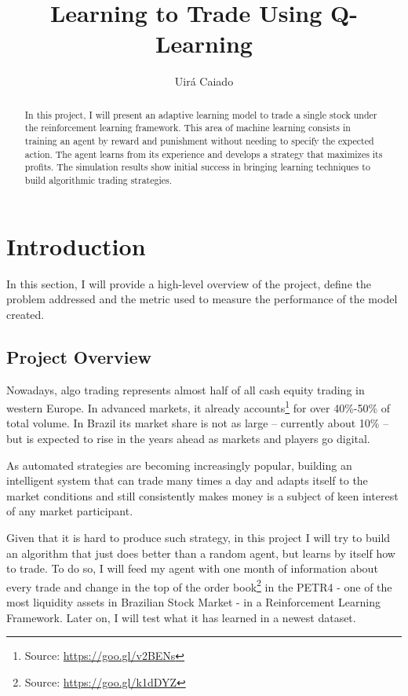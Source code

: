 \documentclass[a4paper]{article}
\title{Learning to Trade Using Q-Learning}
\author{Uirá Caiado}
\begin{document}
\maketitle

\begin{abstract}
In this project, I will present an adaptive learning model to trade a single stock under the reinforcement learning framework. This area of machine learning consists in training an agent by reward and punishment without needing to specify the expected action. The agent learns from its experience and develops a strategy that maximizes its profits. The simulation results show initial success in bringing learning techniques to build algorithmic trading strategies.
\end{abstract}


\section{Introduction}
\label{sec:introduction}

In this section, I will provide a high-level overview of the project, define the problem addressed and the metric used to measure the performance of the model created.

\subsection{Project Overview}
Nowadays, algo trading represents almost half of all cash equity trading in western Europe. In advanced markets, it already accounts\footnote{Source: \url{https://goo.gl/v2BENs}} for over 40\%-50\% of total volume. In Brazil its market share is not as large – currently about 10\% – but is expected to rise in the years ahead as markets and players go digital.

As automated strategies are becoming increasingly popular, building an intelligent system that can trade many times a day and adapts itself to the market conditions and still consistently makes money is a subject of keen interest of any market participant.

Given that it is hard to produce such strategy, in this project I will try to build an algorithm that just does better than a random agent, but learns by itself how to trade. To do so, I will feed my agent with one month of information about every trade and change in the top of the order book\footnote{Source: \url{https://goo.gl/k1dDYZ}} in the PETR4 - one of the most liquidity assets in Brazilian Stock Market - in a Reinforcement Learning Framework. Later on, I will test what it has learned in a newest dataset.
\end{document}
